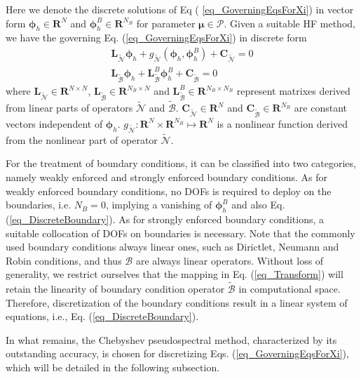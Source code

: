 \documentclass[preprint, 10pt]{elsarticle}
\begin{document}
Here we denote the discrete solutions of Eq ( \ref{eq_GoverningEqsForXi}) in vector form $\pmb{\phi} _h \in \mathbf{R}^{N  }$ and $\pmb{\phi} _h^{B} \in \mathbf{R}^{N_B}$ for parameter $\pmb{\mu}  \in \mathcal{P}$.
Given a suitable HF method, we have the governing Eq. (\ref{eq_GoverningEqsForXi}) in discrete form
\begin{align}
\mathbf{L}_{\widetilde {\mathcal{N}}}\pmb{\phi}_h +g_{\widetilde {\mathcal{N}}}(\pmb{\phi}_h, \pmb{\phi}_h^{B})
+\mathbf{C}_{\widetilde {\mathcal{N}}}
= 0
\label{eq_DiscreteEqs}
\\
\mathbf{L}_{\widetilde {\mathcal{B}}} \pmb{\phi}_h + \mathbf{L}_{\widetilde {\mathcal{B}}}^{B} \pmb{\phi}_h^{B}
+\mathbf{C}_{\widetilde {\mathcal{B}}}
= 0
\label{eq_DiscreteBoundary}
\end{align}
where $\mathbf{L}_{\widetilde {\mathcal{N}}} \in \mathbf{R}^{N \times N}$, $\mathbf{L}_{\widetilde {\mathcal{B}}} \in \mathbf{R}^{N_B \times N}$ and $\mathbf{L}_{\widetilde {\mathcal{B}}}^{B} \in \mathbf{R}^{N_B \times N_B}$ represent matrixes derived from linear parts of operators $\widetilde {\mathcal{N}}$ and $\widetilde {\mathcal{B}}$.
$\mathbf{C}_{\widetilde {\mathcal{N}}} \in \mathbf{R}^{N}$ and $\mathbf{C}_{\widetilde {\mathcal{B}}} \in \mathbf{R}^{N_B}$ are constant vectors independent of $\pmb{\phi} _h$.
$g_{\widetilde {\mathcal{N}}}: \mathbf{R}^N \times \mathbf{R}^{N_B} \mapsto \mathbf{R}^N$ is a nonlinear function derived from the nonlinear part of operator $\widetilde {\mathcal{N}}$.

For the treatment of boundary conditions, it can be classified into two categories, namely weakly enforced and strongly enforced boundary conditions.
As for weakly enforced boundary conditions, no DOFs is required to deploy on the boundaries, i.e. $N_B=0$, implying a vanishing of $\pmb{\phi} _h^{B}$ and also Eq. (\ref{eq_DiscreteBoundary}). As for strongly enforced boundary conditions, a suitable collocation of DOFs on boundaries is necessary. Note that the commonly used boundary conditions always linear ones, such as Dirictlet, Neumann and Robin conditions, and thus $\mathcal{B}$ are always linear operators. Without loss of generality, we restrict ourselves that the mapping in Eq. (\ref{eq_Transform}) will retain the linearity of boundary condition operator $\widetilde {\mathcal{B}}$ in computational space. Therefore, discretization of the boundary conditions result in a linear system of equations, i.e., Eq. (\ref{eq_DiscreteBoundary}).

In what remains, the Chebyshev pseudospectral method, characterized by its outstanding accuracy, is chosen for discretizing Eqs. (\ref{eq_GoverningEqsForXi}),  which will be detailed in the following subsection.
\end{document}
